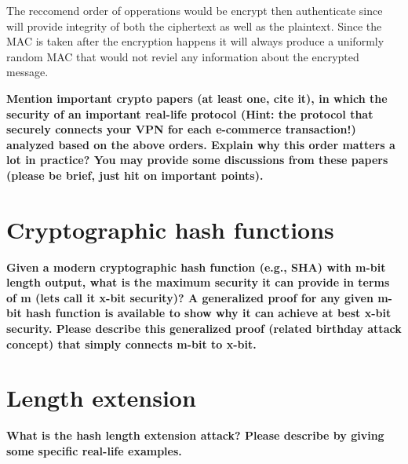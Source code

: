 \documentclass[letterpaper,11pt,notitlepage,fleqn]{article}
\begin{document}
The reccomend order of opperations would be encrypt then authenticate since will provide integrity of both the ciphertext as well as the plaintext. Since the MAC is taken after the encryption happens it will always produce a uniformly random MAC that would not reviel any information about the encrypted message. 

\noindent \textbf{Mention important crypto papers (at least one, cite it), in which the security of an important real-life  protocol  (Hint:  the  protocol  that  securely  connects  your  VPN  for  each  e-commerce transaction!)  analyzed  based  on  the  above  orders.  Explain  why  this  order  matters  a  lot  in practice?  You  may  provide  some  discussions  from  these  papers  (please  be  brief,  just  hit  on important points).}

\section{Cryptographic  hash  functions}
\noindent \textbf{Given  a modern  cryptographic  hash  function  (e.g.,  SHA) with m-bit  length  output, what is  the maximum  security  it  can  provide  in  terms  of  m  (lets  call  it  x-bit  security)? A  generalized proof  for  any  given  m-bit  hash  function  is  available  to  show  why  it  can  achieve  at  best  x-bit security.  Please  describe  this  generalized  proof  (related  birthday  attack  concept)  that  simply connects m-bit to x-bit.}

\section{Length extension}
\noindent \textbf{What  is  the  hash  length  extension  attack?  Please  describe  by  giving  some  specific  real-life examples.}
\end{document}
